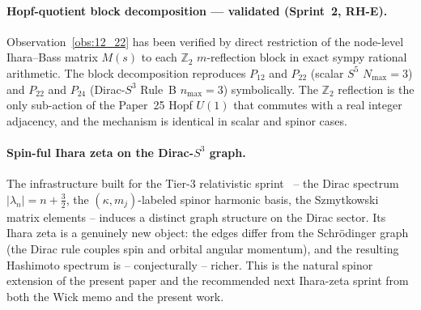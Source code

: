 \documentclass[11pt]{article}
\begin{document}
\paragraph{Hopf-quotient block decomposition --- validated (Sprint~2, RH-E).}
Observation~\ref{obs:12_22} has been verified by direct restriction of
the node-level Ihara--Bass matrix $M(s)$ to each $\mathbb{Z}_2$
$m$-reflection block in exact sympy rational arithmetic.  The block
decomposition reproduces $P_{12}$ and $P_{22}$ (scalar $S^5$
$N_{\max}=3$) and $P_{22}$ and $P_{24}$ (Dirac-$S^3$ Rule~B
$n_{\max}=3$) symbolically.  The $\mathbb{Z}_2$ reflection is the only
sub-action of the Paper~25 Hopf $U(1)$ that commutes with a real
integer adjacency, and the mechanism is identical in scalar and spinor
cases.

\paragraph{Spin-ful Ihara zeta on the Dirac-$S^3$ graph.}  The
infrastructure built for the Tier-3 relativistic
sprint~\cite{paper14,paper18} -- the Dirac spectrum $|\lambda_n|=n+\tfrac32$,
the $(\kappa, m_j)$-labeled spinor harmonic basis, the
Szmytkowski matrix elements -- induces a distinct graph structure
on the Dirac sector.  Its Ihara zeta is a genuinely new object:
the edges differ from the Schr\"odinger graph (the Dirac rule
couples spin and orbital angular momentum), and the resulting Hashimoto
spectrum is -- conjecturally -- richer.  This is the natural spinor
extension of the present paper and the recommended next Ihara-zeta
sprint from both the Wick memo and the present work.
\end{document}
